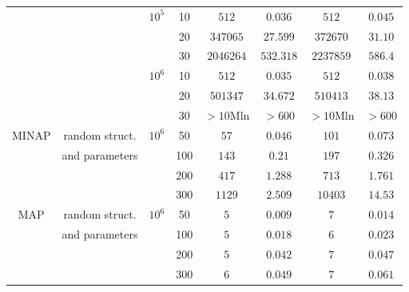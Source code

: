 \documentclass{article}
\begin{document}
{\begin{table}[ht]
\begin{center}
\begin{tabular}{cccc|cc|cc}
                      &                & $10^{5}$  & 10    & $512$                       & $0.036$                     & $512$     & $0.045$ \\
                      &                &           & 20    & $347065$                    & $27.599$                    & $372670$  & $31.10$ \\
                      &                &           & 30    & $2046264$                   & $532.318$                   & $2237859$ & $586.4$ \\
                      &                & $10^{6}$  & 10    & $512$                       & $0.035$                     & $512$     & $0.038$ \\
                      &                &           & 20    & $501347$                    & $34.672$                    & $510413$  & $38.13$ \\
                      &                &           & 30    & $>10$Mln                    & $>600$                      & $>10$Mln  & $>600$  \\
              MINAP   & random struct. & $10^{6}$  & 50    & $57$                        & $0.046$                     & $101$     & $0.073$ \\
                      & and parameters &           & 100   & $143$                       & $0.21$                      & $197$     & $0.326$ \\
                      &                &           & 200   & $417$                       & $1.288$                     & $713$     & $1.761$ \\
                      &                &           & 300   & $1129$                      & $2.509$                     & $10403$   & $14.53$ \\
              MAP     & random struct. & $10^{6}$  & 50    & $5$                         & $0.009$                     & $7$       & $0.014$ \\
                      & and parameters &           & 100   & $5$                         & $0.018$                     & $6$       & $0.023$ \\
                      &                &           & 200   & $5$                         & $0.042$                     & $7$       & $0.047$ \\
                      &                &           & 300   & $6$                         & $0.049$                     & $7$       & $0.061$ \\
              \hline
          \end{tabular}
      \end{center}
  \end{table}

  \lipsum[1-4]
 }
\end{document}
